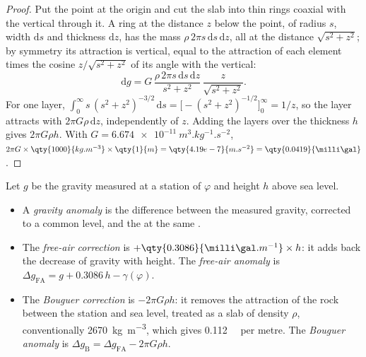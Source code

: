\begin{proof}
Put the point at the origin and cut the slab into thin rings coaxial with the
vertical through it. A ring at the distance $z$ below the point, of radius
$s$, width $\mathrm ds$ and thickness $\mathrm dz$, has the mass
$\rho\,2\pi s\,\mathrm ds\,\mathrm dz$, all at the distance $\sqrt{s^2 + z^2}$;
by symmetry its attraction is vertical, equal to the attraction of each
element times the cosine $z/\sqrt{s^2+z^2}$ of its angle with the vertical:
\[
  \mathrm dg = G\,\frac{\rho\,2\pi s\,\mathrm ds\,\mathrm dz}{s^2 + z^2}\,
  \frac{z}{\sqrt{s^2 + z^2}} .
\]
For one layer, $\int_0^\infty s\,(s^2 + z^2)^{-3/2}\,\mathrm ds =
\bigl[-(s^2 + z^2)^{-1/2}\bigr]_0^\infty = 1/z$, so the layer attracts with
$2\pi G\rho\,\mathrm dz$, independently of $z$. Adding the layers over the
thickness $h$ gives $2\pi G\rho h$. With $G = \qty{6.674e-11}{m^3.kg^{-1}.s^{-2}}$,
$2\pi G\times\qty{1000}{kg.m^{-3}}\times\qty{1}{m} = \qty{4.19e-7}{m.s^{-2}} =
\qty{0.0419}{\milli\gal}$.
\end{proof}

\begin{definition}\label{def:b1:isostasy-gravity:anomalies}
Let $g$ be the gravity measured at a station of  $\varphi$ and height $h$
above sea level.
\begin{itemize}
  \item A \emph{gravity anomaly} is the difference
        between the measured gravity, corrected to a common level, and the
         at the same .
  \item The \emph{free-air correction} is
        $+\qty{0.3086}{\milli\gal.m^{-1}}\times h$: it adds back the decrease
        of gravity with height. The \emph{free-air
        anomaly} is
        $\Delta g_{\mathrm{FA}} = g + 0.3086\,h - \gamma(\varphi)$.
  \item The \emph{Bouguer correction} is $-2\pi G\rho h$:
        it removes the attraction of the rock between the station and sea
        level, treated as a slab of density $\rho$, conventionally
        \qty{2670}{kg.m^{-3}}, which gives \qty{0.112}{\milli\gal} per metre.
        The \emph{Bouguer anomaly} is
        $\Delta g_{\mathrm B} = \Delta g_{\mathrm{FA}} - 2\pi G\rho h$.
\end{itemize}
\end{definition}

